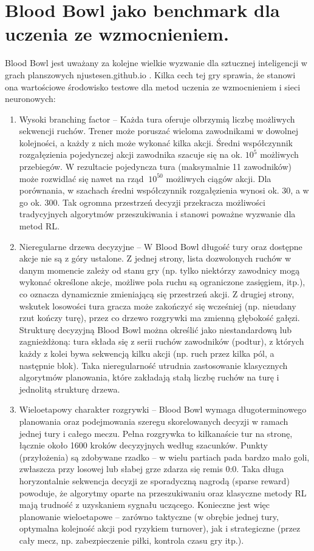 \section{Blood Bowl jako benchmark dla uczenia ze wzmocnieniem.}

Blood Bowl jest uważany za kolejne wielkie wyzwanie dla sztucznej inteligencji w grach planszowych
njustesen.github.io
. Kilka cech tej gry sprawia, że stanowi ona wartościowe środowisko testowe dla metod uczenia ze wzmocnieniem i sieci neuronowych:
\begin{enumerate}
	\item Wysoki branching factor – Każda tura oferuje olbrzymią liczbę możliwych sekwencji ruchów. Trener może poruszać wieloma zawodnikami w dowolnej kolejności, a każdy z nich może wykonać kilka akcji. Średni współczynnik rozgałęzienia pojedynczej akcji zawodnika szacuje się na ok. $10^5$ możliwych przebiegów. W rezultacie pojedyncza tura (maksymalnie 11 zawodników) może rozwidlać się nawet na rząd $~10^{50}$ możliwych ciągów akcji. Dla porównania, w szachach średni współczynnik rozgałęzienia wynosi ok. 30, a w go ok. 300. Tak ogromna przestrzeń decyzji przekracza możliwości tradycyjnych algorytmów przeszukiwania i stanowi poważne wyzwanie dla metod RL.
	\item Nieregularne drzewa decyzyjne – W Blood Bowl długość tury oraz dostępne akcje nie są z góry ustalone. Z jednej strony, lista dozwolonych ruchów w danym momencie zależy od stanu gry (np. tylko niektórzy zawodnicy mogą wykonać określone akcje, możliwe pola ruchu są ograniczone zasięgiem, itp.), co oznacza dynamicznie zmieniającą się przestrzeń akcji. Z drugiej strony, wskutek losowości tura gracza może zakończyć się wcześniej (np. nieudany rzut kończy turę), przez co drzewo rozgrywki ma zmienną głębokość gałęzi. Strukturę decyzyjną Blood Bowl można określić jako niestandardową lub zagnieżdżoną: tura składa się z serii ruchów zawodników (podtur), z których każdy z kolei bywa sekwencją kilku akcji (np. ruch przez kilka pól, a następnie blok). Taka nieregularność utrudnia zastosowanie klasycznych algorytmów planowania, które zakładają stałą liczbę ruchów na turę i jednolitą strukturę drzewa.
	\item Wieloetapowy charakter rozgrywki – Blood Bowl wymaga długoterminowego planowania oraz podejmowania szeregu skorelowanych decyzji w ramach jednej tury i całego meczu. Pełna rozgrywka to kilkanaście tur na stronę, łącznie około 1600 kroków decyzyjnych według szacunków. Punkty (przyłożenia) są zdobywane rzadko – w wielu partiach pada bardzo mało goli, zwłaszcza przy losowej lub słabej grze zdarza się remis 0:0. Taka długa horyzontalnie sekwencja decyzji ze sporadyczną nagrodą (sparse reward) powoduje, że algorytmy oparte na przeszukiwaniu oraz klasyczne metody RL mają trudność z uzyskaniem sygnału uczącego. Konieczne jest więc planowanie wieloetapowe – zarówno taktyczne (w obrębie jednej tury, optymalna kolejność akcji pod ryzykiem turnover), jak i strategiczne (przez cały mecz, np. zabezpieczenie piłki, kontrola czasu gry itp.).

\end{enumerate}
